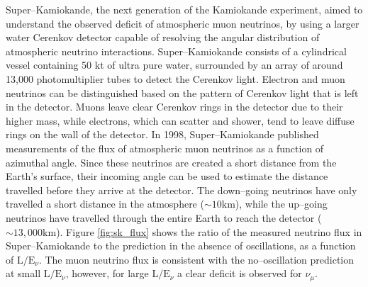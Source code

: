 Super--Kamiokande, the next generation of the Kamiokande experiment, aimed to
understand the observed deficit of atmospheric muon neutrinos, by using a larger
water Cerenkov detector capable of resolving the angular distribution of 
atmospheric neutrino interactions. Super--Kamiokande consists of a cylindrical 
vessel containing 50 kt of ultra pure water, surrounded by an array of around 
13,000 photomultiplier tubes to detect the Cerenkov light. Electron and muon 
neutrinos can be distinguished based on the pattern of Cerenkov light that is 
left in the detector. Muons leave clear Cerenkov rings in the detector due to 
their higher mass, while electrons, which can scatter and shower, tend to leave 
diffuse  rings on the wall of the detector. In 1998, 
Super--Kamiokande published measurements of the flux of atmospheric muon 
neutrinos as a function of azimuthal angle\cite{Fukuda1998}. Since these 
neutrinos are created a short distance from the Earth's surface, their incoming 
angle can be used to estimate the distance travelled before they arrive at the 
detector. The down--going neutrinos have only travelled a short distance in 
the atmosphere (\(\sim 10 \mbox{km}\)), while the up--going neutrinos have 
travelled through the entire Earth to reach the detector (\(\sim 13,000 
\mbox{km}\)). Figure \ref{fig:sk_flux} shows the ratio of the measured neutrino 
flux in Super--Kamiokande to the prediction in the absence of oscillations, as a
function of \(\mbox{L} / \mbox{E}_\nu\). The muon neutrino flux is consistent 
with the no--oscillation prediction at small \(\mbox{L} / \mbox{E}_\nu\), 
however, for large \(\mbox{L} / \mbox{E}_\nu\) a clear deficit is observed for
$\nu_\mu$.

